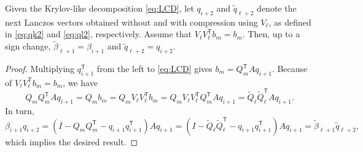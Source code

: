 \documentclass{siamart190516}
\newcommand{\Ttran}{\mathsf{T}}
\begin{document}
\begin{proposition}
    \label{prop:compression}
    Given the Krylov-like decomposition \cref{eq:LCD}, let $q_{i+2}$ and $\widetilde{q}_{\ell+2}$ denote the next Lanczos vectors obtained without and with compression using $V_{\ell}$, as defined in \cref{eq:qk2} and \cref{eq:ql2}, respectively. Assume that $V_{\ell}V_{\ell}^{\Ttran}b_{m}=b_{m}$. Then, up to a sign change, $\widetilde{\beta}_{\ell+1}=\beta_{i+1}$ and $\widetilde{q}_{\ell+2} = q_{i+2}$.
\end{proposition}
\begin{proof}
    Multiplying $q_{i+1}^{\Ttran}$ from the left to \cref{eq:LCD} gives 
    $b_{m}=Q_{m}^{\Ttran}Aq_{i+1}$. Because of $V_{\ell}V_{\ell}^{\Ttran}b_{m}=b_{m}$, we have
    \begin{equation*}
        Q_{m}Q_{m}^{\Ttran}Aq_{i+1} = Q_{m}b_{m} = Q_{m}V_{\ell}V_{\ell}^{\Ttran}b_{m} = Q_{m}V_{\ell}V_{\ell}^{\Ttran}Q_{m}^{\Ttran}Aq_{i+1} = \widetilde{Q}_{\ell}\widetilde{Q}_{\ell}^{\Ttran}Aq_{i+1}.
    \end{equation*}
    In turn,
    \begin{equation*}
        \beta_{i+1}q_{i+2} = (I-Q_{m}Q_{m}^{\Ttran}-q_{i+1}q_{i+1}^{\Ttran})Aq_{i+1}  
        = (I-\widetilde{Q}_{\ell}\widetilde{Q}_{\ell}^{\Ttran}-q_{i+1}q_{i+1}^{\Ttran})Aq_{i+1} 
        =  \widetilde{\beta}_{\ell+1}\widetilde{q}_{\ell+2},
    \end{equation*}
    which implies the desired result.
\end{proof}
\end{document}

